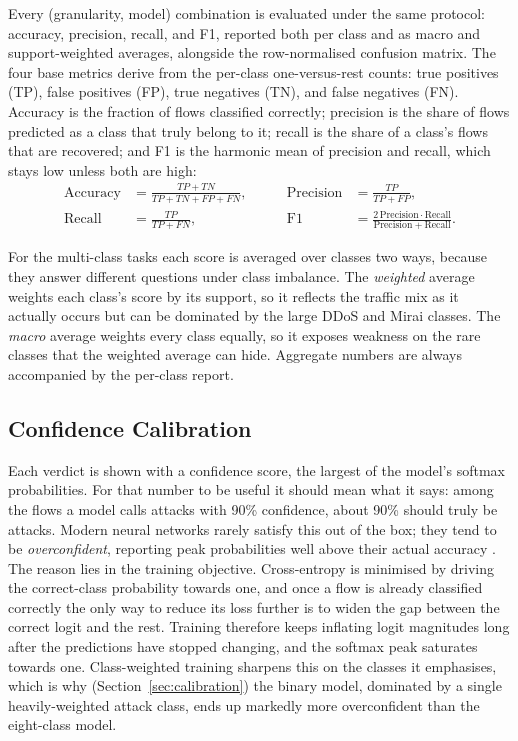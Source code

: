 \par Every (granularity, model) combination is evaluated under the same protocol: accuracy, precision, recall, and F1, reported both per class and as macro and support-weighted averages, alongside the row-normalised confusion matrix. The four base metrics derive from the per-class one-versus-rest counts: true positives (TP), false positives (FP), true negatives (TN), and false negatives (FN). Accuracy is the fraction of flows classified correctly; precision is the share of flows predicted as a class that truly belong to it; recall is the share of a class's flows that are recovered; and F1 is the harmonic mean of precision and recall, which stays low unless both are high:
\begin{equation}
\begin{aligned}
\mathrm{Accuracy}  &= \frac{TP + TN}{TP + TN + FP + FN}, &\qquad
\mathrm{Precision} &= \frac{TP}{TP + FP}, \\[8pt]
\mathrm{Recall}    &= \frac{TP}{TP + FN}, &\qquad
\mathrm{F1}        &= \frac{2\,\mathrm{Precision}\cdot\mathrm{Recall}}{\mathrm{Precision} + \mathrm{Recall}}.
\end{aligned}
\end{equation}

\par For the multi-class tasks each score is averaged over classes two ways, because they answer different questions under class imbalance. The \emph{weighted} average weights each class's score by its support, so it reflects the traffic mix as it actually occurs but can be dominated by the large DDoS and Mirai classes. The \emph{macro} average weights every class equally, so it exposes weakness on the rare classes that the weighted average can hide. Aggregate numbers are always accompanied by the per-class report.

\subsection{Confidence Calibration}
\label{subsec:calibration_method}

\par Each verdict is shown with a confidence score, the largest of the model's softmax probabilities. For that number to be useful it should mean what it says: among the flows a model calls attacks with 90\% confidence, about 90\% should truly be attacks. Modern neural networks rarely satisfy this out of the box; they tend to be \emph{overconfident}, reporting peak probabilities well above their actual accuracy \cite{Guo2017}. The reason lies in the training objective. Cross-entropy is minimised by driving the correct-class probability towards one, and once a flow is already classified correctly the only way to reduce its loss further is to widen the gap between the correct logit and the rest. Training therefore keeps inflating logit magnitudes long after the predictions have stopped changing, and the softmax peak saturates towards one. Class-weighted training sharpens this on the classes it emphasises, which is why (Section~\ref{sec:calibration}) the binary model, dominated by a single heavily-weighted attack class, ends up markedly more overconfident than the eight-class model.

